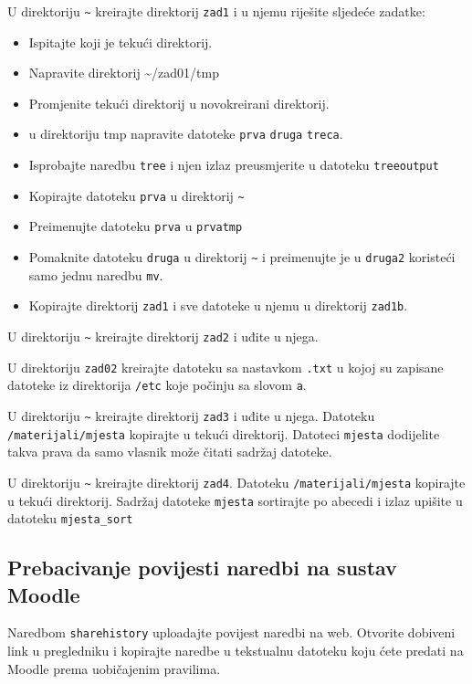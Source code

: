 \begin{zadatak} U direktoriju \texttt{\textasciitilde}  kreirajte direktorij \texttt{zad1} i u njemu riješite sljedeće zadatke:
	\begin{itemize}
		\item Ispitajte koji je tekući direktorij.
		\item Napravite direktorij \textasciitilde /zad01/tmp
		\item Promjenite tekući direktorij u novokreirani direktorij.
		\item u direktoriju tmp napravite datoteke \texttt{prva} \texttt{druga} \texttt{treca}.
		\item Isprobajte naredbu \texttt{tree} i njen izlaz preusmjerite u datoteku \texttt{treeoutput}
		\item Kopirajte datoteku \texttt{prva} u direktorij  \texttt{\textasciitilde}
		\item Preimenujte datoteku \texttt{prva} u \texttt{prvatmp}
		\item Pomaknite datoteku \texttt{druga} u direktorij  \texttt{\textasciitilde} i preimenujte je u \texttt{druga2} koristeći samo jednu naredbu \texttt{mv}.
		\item Kopirajte direktorij \texttt{zad1} i sve datoteke u njemu u direktorij \texttt{zad1b}.
	\end{itemize}
\end{zadatak}


\begin{zadatak} 
	U direktoriju \texttt{\textasciitilde} kreirajte direktorij \texttt{zad2} i uđite u njega.
		\item U direktoriju \texttt{zad02} kreirajte datoteku sa nastavkom \texttt{.txt} u kojoj su zapisane datoteke iz direktorija \texttt{/etc} koje počinju sa slovom \texttt{a}.
		
\end{zadatak}

\begin{zadatak}
	U direktoriju \texttt{\textasciitilde} kreirajte direktorij \texttt{zad3}  i uđite u njega. Datoteku \texttt{/materijali/mjesta} kopirajte u tekući direktorij. Datoteci \texttt{mjesta} dodijelite takva prava da samo vlasnik može čitati sadržaj datoteke.
\end{zadatak}

\begin{zadatak}
	U direktoriju \texttt{\textasciitilde}  kreirajte direktorij \texttt{zad4}. Datoteku \texttt{/materijali/mjesta} kopirajte u tekući direktorij. Sadržaj datoteke \texttt{mjesta} sortirajte po abecedi i izlaz upišite u datoteku \texttt{mjesta\_sort} 
\end{zadatak}

\subsection*{Prebacivanje povijesti naredbi na sustav Moodle}

Naredbom \texttt{sharehistory} uploadajte povijest naredbi na web. Otvorite dobiveni link u pregledniku i kopirajte naredbe u tekstualnu datoteku koju ćete predati na Moodle prema uobičajenim pravilima.
